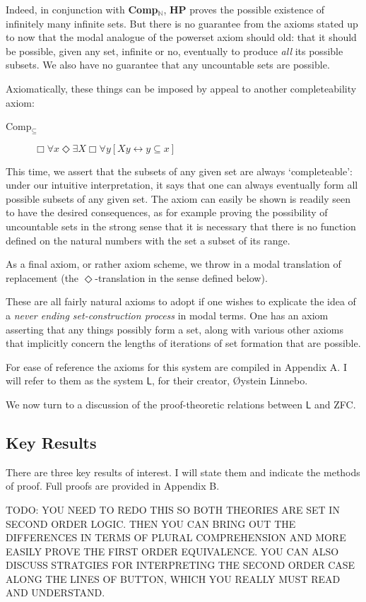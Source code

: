 \documentclass{article}
\begin{document}
Indeed, in conjunction with {\bf Comp$_\mathbb{N}$}, 
{\bf HP} proves the possible existence of infinitely many
infinite sets. But there is no guarantee from the axioms stated up to now that 
the modal analogue of the powerset axiom should old: that it should be possible, 
given any set, infinite or no, eventually to produce \emph{all} its possible subsets. 
We also have no guarantee that any uncountable sets are possible.

Axiomatically, these things can be imposed by appeal to another completeability axiom:
\begin{description}
    \item[Comp$_\subseteq$]
    $\Box \forall x \Diamond \exists X \Box \forall y[ Xy \leftrightarrow y \subseteq x]$
\end{description}
This time, we assert that the subsets of any given set are always `completeable': 
under our intuitive interpretation, 
it says that one can always eventually form all possible subsets of any given set. 
The axiom can easily be shown is readily seen to have the desired consequences, as 
for example proving the possibility of uncountable sets in the strong sense that 
it is necessary that there is no function defined on the natural numbers with the set 
a subset of its range.

As a final axiom, or rather axiom scheme, we throw in a modal 
translation of replacement (the $\Diamond$-translation in the sense defined below).

These are all fairly natural axioms to adopt if one wishes to explicate the idea 
of a \emph{never ending set-construction process} in modal terms. One has an axiom 
asserting that any things possibly form a set, along with various other axioms 
that implicitly concern the lengths of iterations of set formation that are possible.

For ease of reference the axioms 
for this system are compiled in Appendix A. I will refer to them as the system $\mathsf{L}$,
for their creator, \O ystein Linnebo.

We now turn to a discussion of the proof-theoretic relations between $\mathsf{L}$
and ZFC. 
\subsection{Key Results}
There are three key results of interest. I will state them and indicate the methods of proof. 
Full proofs are provided in Appendix B. 

TODO: YOU NEED TO REDO THIS SO BOTH THEORIES ARE SET IN 
SECOND ORDER LOGIC. THEN YOU CAN BRING OUT THE DIFFERENCES IN 
TERMS OF PLURAL COMPREHENSION AND MORE EASILY PROVE THE FIRST ORDER 
EQUIVALENCE. YOU CAN ALSO DISCUSS STRATGIES FOR INTERPRETING 
THE SECOND ORDER CASE ALONG THE LINES OF BUTTON, WHICH YOU REALLY 
MUST READ AND UNDERSTAND.
\end{document}
